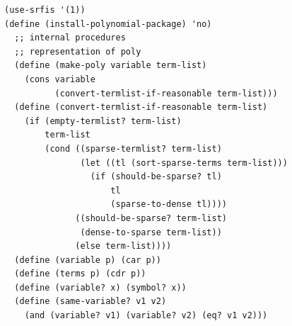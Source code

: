 \documentclass[final,fleqn,titlepage,twoside]{article}
\begin{document}
\begin{verbatim}
(use-srfis '(1))
(define (install-polynomial-package) 'no)
  ;; internal procedures
  ;; representation of poly
  (define (make-poly variable term-list)
    (cons variable
          (convert-termlist-if-reasonable term-list)))
  (define (convert-termlist-if-reasonable term-list)
    (if (empty-termlist? term-list)
        term-list
        (cond ((sparse-termlist? term-list)
               (let ((tl (sort-sparse-terms term-list)))
                 (if (should-be-sparse? tl)
                     tl
                     (sparse-to-dense tl))))
              ((should-be-sparse? term-list)
               (dense-to-sparse term-list))
              (else term-list))))
  (define (variable p) (car p))
  (define (terms p) (cdr p))
  (define (variable? x) (symbol? x))
  (define (same-variable? v1 v2)
    (and (variable? v1) (variable? v2) (eq? v1 v2)))
  

\end{verbatim}
\end{document}
